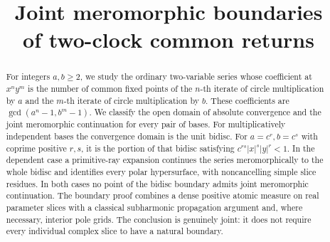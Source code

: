 \documentclass[11pt]{article}
\title{Joint meromorphic boundaries\\of two-clock common returns}
\author{}
\date{}
\theoremstyle{definition}
\theoremstyle{remark}
\begin{document}
\maketitle
\begin{abstract}
For integers \(a,b\geq2\), we study the ordinary two-variable series whose
coefficient at \(x^ny^m\) is the number of common fixed points of the
\(n\)-th iterate of circle multiplication by \(a\) and the \(m\)-th iterate
of circle multiplication by \(b\). These coefficients are
\(\gcd(a^n-1,b^m-1)\). We classify the open domain of absolute convergence
and the joint meromorphic continuation for every pair of bases.
For multiplicatively independent bases the convergence domain is the
unit bidisc. For \(a=c^r,b=c^s\) with coprime positive \(r,s\), it is the
portion of that bidisc satisfying \(c^{rs}|x|^s|y|^r<1\).
In the dependent case a primitive-ray expansion continues the series
meromorphically to the whole bidisc and identifies every polar
hypersurface, with noncancelling simple slice residues. In both cases no
point of the bidisc boundary admits joint meromorphic continuation.
The boundary proof combines a dense positive atomic measure on real
parameter slices with a classical subharmonic propagation argument and,
where necessary, interior pole grids. The conclusion is genuinely joint:
it does not require every individual complex slice to have a natural
boundary.
\end{abstract}









\end{document}
